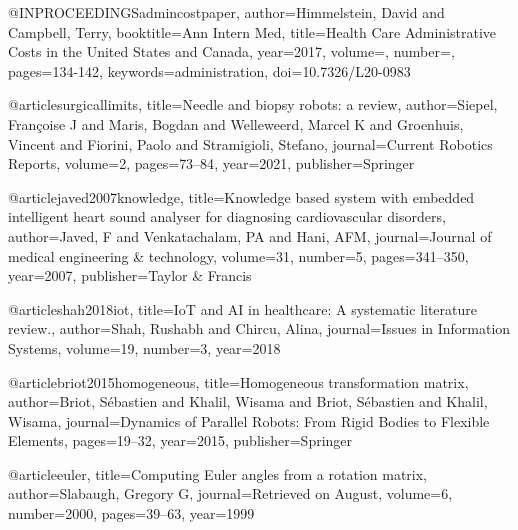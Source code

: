 


@INPROCEEDINGS{admincostpaper,
  author={Himmelstein, David and Campbell, Terry},
  booktitle={Ann Intern Med}, 
  title={Health Care Administrative Costs in the United States and Canada}, 
  year={2017},
  volume={},
  number={},
  pages={134-142},
  keywords={administration},
  doi={10.7326/L20-0983}}

@article{surgicallimits,
  title={Needle and biopsy robots: a review},
  author={Siepel, Fran{\c{c}}oise J and Maris, Bogdan and Welleweerd, Marcel K and Groenhuis, Vincent and Fiorini, Paolo and Stramigioli, Stefano},
  journal={Current Robotics Reports},
  volume={2},
  pages={73--84},
  year={2021},
  publisher={Springer}
}






@article{javed2007knowledge,
  title={Knowledge based system with embedded intelligent heart sound analyser for diagnosing cardiovascular disorders},
  author={Javed, F and Venkatachalam, PA and Hani, AFM},
  journal={Journal of medical engineering \& technology},
  volume={31},
  number={5},
  pages={341--350},
  year={2007},
  publisher={Taylor \& Francis}
}

@article{shah2018iot,
  title={IoT and AI in healthcare: A systematic literature review.},
  author={Shah, Rushabh and Chircu, Alina},
  journal={Issues in Information Systems},
  volume={19},
  number={3},
  year={2018}
}







@article{briot2015homogeneous,
  title={Homogeneous transformation matrix},
  author={Briot, S{\'e}bastien and Khalil, Wisama and Briot, S{\'e}bastien and Khalil, Wisama},
  journal={Dynamics of Parallel Robots: From Rigid Bodies to Flexible Elements},
  pages={19--32},
  year={2015},
  publisher={Springer}
}

@article{euler,
  title={Computing Euler angles from a rotation matrix},
  author={Slabaugh, Gregory G},
  journal={Retrieved on August},
  volume={6},
  number={2000},
  pages={39--63},
  year={1999}
}
